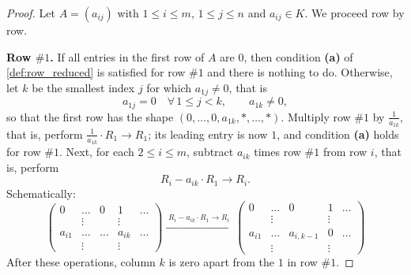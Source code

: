 \begin{proof}
Let $A = (a_{ij})$ with $1 \le i \le m$, $1 \le j \le n$ and $a_{ij} \in K$. We proceed row by row.

\textbf{Row $\#1$.} If all entries in the first row of $A$ are $0$, then condition \textbf{(a)} of \cref{def:row_reduced} is satisfied for row $\#1$ and there is nothing to do. Otherwise, let $k$ be the smallest index $j$ for which $a_{1j} \ne 0$, that is
\[
a_{1j} = 0 \quad \forall \, 1 \le j < k, \qquad a_{1k} \ne 0,
\]
so that the first row has the shape $(0, \dots, 0, a_{1k}, \ast, \dots, \ast)$. Multiply row $\#1$ by $\frac{1}{a_{1k}}$, that is, perform $\frac{1}{a_{1k}} \cdot R_1 \to R_1$; its leading entry is now $1$, and condition \textbf{(a)} holds for row $\#1$. Next, for each $2 \le i \le m$, subtract $a_{ik}$ times row $\#1$ from row $i$, that is, perform
\[
R_i - a_{ik} \cdot R_1 \to R_i.
\]
Schematically:
\[
\begin{pmatrix}
0 & \dots & 0 & 1 & \dots \\
& \vdots & & \vdots & \\
a_{i1} & \dots & \dots & a_{ik} & \dots \\
& \vdots & & \vdots &
\end{pmatrix}
\xrightarrow{\; R_i - a_{ik} \cdot R_1 \to R_i \;}
\begin{pmatrix}
0 & \dots & 0 & 1 & \dots \\
& \vdots & & \vdots & \\
a_{i1} & \dots & a_{i,k-1} & 0 & \dots \\
& \vdots & & \vdots &
\end{pmatrix}
\]
After these operations, column $k$ is zero apart from the $1$ in row $\#1$.


\end{proof}
